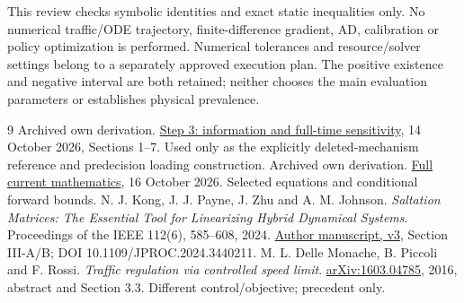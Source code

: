 \documentclass[11pt,a4paper]{article}
\begin{document}
This review checks symbolic identities and exact static inequalities only.
No numerical traffic/ODE trajectory, finite-difference gradient, AD,
calibration or policy optimization is performed. Numerical tolerances and
resource/solver settings belong to a separately approved execution plan.
The positive existence and negative interval are both retained; neither
chooses the main evaluation parameters or establishes physical prevalence.

\begin{thebibliography}{9}
 Archived own derivation.
\href{vsl_step3_information_and_sensitivity.pdf}{Step 3: information and full-time sensitivity},
14 October 2026, Sections 1--7. Used only as the explicitly deleted-mechanism
reference and predecision loading construction.
 Archived own derivation.
\href{vsl_feedback8_full_mathematics.pdf}{Full current mathematics},
16 October 2026. Selected equations and conditional forward bounds.
 N. J. Kong, J. J. Payne, J. Zhu and A. M. Johnson.
\emph{Saltation Matrices: The Essential Tool for Linearizing Hybrid
Dynamical Systems}. Proceedings of the IEEE 112(6), 585--608, 2024.
\href{https://arxiv.org/pdf/2306.06862}{Author manuscript, v3},
Section III-A/B; DOI 10.1109/JPROC.2024.3440211.
 M. L. Delle Monache, B. Piccoli and F. Rossi.
\emph{Traffic regulation via controlled speed limit}.
\href{https://arxiv.org/pdf/1603.04785}{arXiv:1603.04785}, 2016,
abstract and Section 3.3. Different control/objective; precedent only.
\end{thebibliography}
\end{document}
